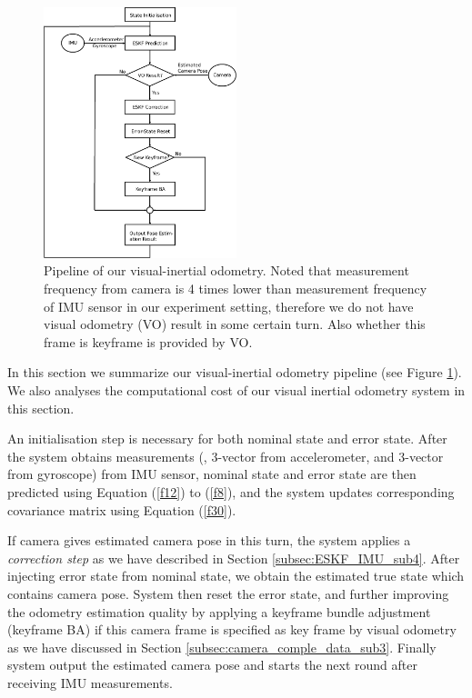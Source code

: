 \begin{figure}[b]
    \centering
    \includegraphics[width=0.5\textwidth]{CONTENT/Figure/Figure4-1_Pipeline.png}
    \caption{Pipeline of our visual-inertial odometry. Noted that measurement frequency from camera is 4 times lower than measurement frequency of IMU sensor in our experiment setting, therefore we do not have visual odometry (VO) result in some certain turn. Also whether this frame is keyframe is provided by VO.}
    \label{fig:fig4-1}
\end{figure}


In this section we summarize our visual-inertial odometry pipeline (see Figure \ref{fig:fig4-1}). We also analyses the computational cost of our visual inertial odometry system in this section.

An initialisation step is necessary for both nominal state and error state. After the system obtains measurements (\eg, 3-vector from accelerometer, and 3-vector from gyroscope) from IMU sensor, nominal state and error state are then predicted using Equation (\ref{f12}) to (\ref{f8}), and the system updates corresponding covariance matrix using Equation (\ref{f30}). 

If camera gives estimated camera pose in this turn, the system applies a \textit{correction step} as we have described in Section \ref{subsec:ESKF_IMU_sub4}. After injecting error state from nominal state, we obtain the estimated true state which contains camera pose. System then reset the error state, and further improving the odometry estimation quality by applying a keyframe bundle adjustment (keyframe BA) if this camera frame is specified as key frame by visual odometry as we have discussed in Section \ref{subsec:camera_comple_data_sub3}. Finally system output the estimated camera pose and starts the next round after receiving IMU measurements.

